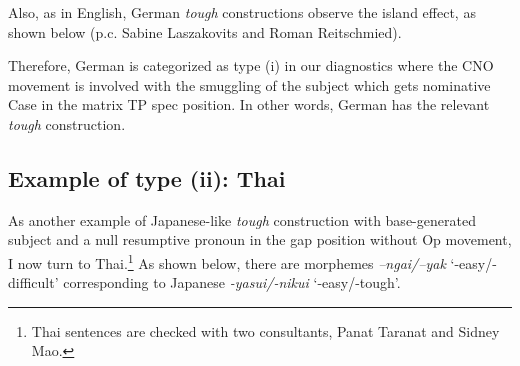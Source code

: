 \documentclass[output=paper]{langscibook}
\begin{document}
\begin{exe}


\end{exe}

Also, as in English, German \textit{tough} constructions observe the island effect, as shown below (p.c. Sabine Laszakovits and Roman Reitschmied). 

\begin{exe}
\ex \label{25ha}
\begin{xlist}



\end{xlist}
\end{exe}

Therefore, German is categorized as type (i) in our diagnostics where the CNO movement is involved with the smuggling of the subject which gets nominative Case in the matrix TP spec position. In other words, German has the relevant \textit{tough} construction.

\subsection{Example of type (ii): Thai} \label{s3.3ha}
As another example of Japanese-like \textit{tough} construction with base-generated subject and a null resumptive pronoun in the gap position without Op movement, I now turn to Thai.\footnote{Thai sentences are checked with two consultants, Panat Taranat and Sidney Mao.} As shown below, there are morphemes \textit{–ngai/–yak} ‘-easy/-difficult’ corresponding to Japanese \textit{-yasui/-nikui} ‘-easy/-tough’. 
\end{document}
